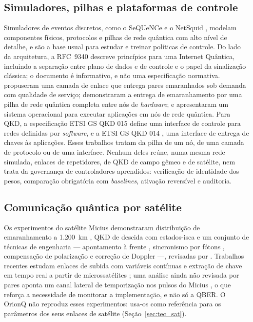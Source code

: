\documentclass[12pt]{article}
\providecommand{\citeasnoun}[1]{\cite{#1}}
\begin{document}
\subsection{Simuladores, pilhas e plataformas de controle}

Simuladores de eventos discretos, como o SeQUeNCe \cite{wu2021} e o NetSquid
\cite{coopmans2021}, modelam componentes físicos, protocolos e pilhas de rede
quântica com alto nível de detalhe, e são a base usual para estudar e treinar
políticas de controle. Do lado da arquitetura, a RFC~9340 \cite{kozlowski2023}
descreve princípios para uma Internet Quântica, incluindo a separação entre
plano de dados e de controle e o papel da sinalização clássica; o documento é
informativo, e não uma especificação normativa. \citeasnoun{dahlberg2019}
propuseram uma camada de enlace que entrega pares emaranhados sob demanda com
qualidade de serviço; \citeasnoun{pompili2022} demonstraram a entrega de
emaranhamento por uma pilha de rede quântica completa entre nós de
\textit{hardware}; e \citeasnoun{delledonne2025} apresentaram um sistema
operacional para executar aplicações em nós de rede quântica. Para QKD, a
especificação ETSI GS QKD 015 \cite{etsiqkd015} define uma interface de controle
para redes definidas por \textit{software}, e a ETSI GS QKD 014 \cite{etsi014},
uma interface de entrega de chaves às aplicações. Esses trabalhos tratam da pilha
de um nó, de uma camada de protocolo ou de uma interface. Nenhum deles reúne, numa
mesma rede simulada, enlaces de repetidores, de QKD de campo gêmeo e de satélite,
nem trata da governança de controladores aprendidos: verificação de identidade
dos pesos, comparação obrigatória com \textit{baselines}, ativação reversível e
auditoria.

\subsection{Comunicação quântica por satélite}

Os experimentos do satélite Micius demonstraram distribuição de emaranhamento a
1.200~km \cite{yin2017}, QKD de descida com estados-isca \cite{liao2017} e um
conjunto de técnicas de engenharia --- apontamento à frente \cite{han2018},
sincronismo por fótons \cite{wang2021sync}, compensação de polarização e
correção de Doppler ---, revisadas por \citeasnoun{lu2022}. Trabalhos recentes
estudam enlaces de subida com variáveis contínuas \cite{cheng2025} e extração de
chave em tempo real a partir de microssatélites \cite{li2025}; uma análise ainda
não revisada por pares aponta um canal lateral de temporização nos pulsos do
Micius \cite{miller2025}, o que reforça a necessidade de monitorar a
implementação, e não só a QBER. O OrionQ não reproduz esses experimentos: usa-os
como referência para os parâmetros dos seus enlaces de satélite
(Seção~\ref{sec:tec_sat}).
\end{document}
